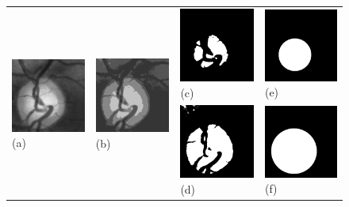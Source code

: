 \begin{figure}[t]

    \centering
    \renewcommand{\arraystretch}{2}
    
    \begin{tabular}{p{2.5cm} p{2.5cm} p{2.5cm} p{2.5cm}}
        
        {} & {} & \multirow{2}{*}{\includegraphics[width=2.5cm]{Images/Methode/Segmentation/2_cup.png}{(c)}} & 
        \multirow{2}{*}{\includegraphics[width=2.5cm]{Images/Methode/Segmentation/6_hough_cup.png}{(e)}} \\
        
        \multirow{2}{*}{\includegraphics[width=2.5cm]{Images/Methode/Segmentation/0_crop.png}{(a)}} & 
        \multirow{2}{*}{\includegraphics[width=2.5cm]{Images/Methode/Segmentation/1_kmeans.png}{(b)}} & {} & {} \\
        
        {} & {} & \multirow{2}{*}{\includegraphics[width=2.5cm]{Images/Methode/Segmentation/3_do.png}{(d)}} & 
        \multirow{2}{*}{\includegraphics[width=2.5cm]{Images/Methode/Segmentation/7_hough_do.png}{(f)}} \\
        

\end{tabular}
\end{figure}

